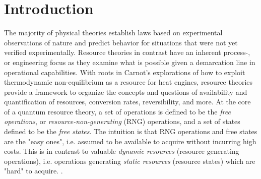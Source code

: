 

\section{Introduction}

The majority of physical theories establish laws based on experimental observations of nature and predict behavior for situations that were not yet verified experimentally. Resource theories in contrast have an inherent process-, or engineering focus as they examine what is possible given a demarcation line in operational capabilities. With roots in Carnot's explorations of how to exploit thermodynamic non-equilibrium as a resource for heat engines, resource theories provide a framework to organize the concepts and questions of availability and quantification of resources, conversion rates, reversibility, and more. At the core of a quantum resource theory, a set of operations is defined to be the \textit{free operations}, or \textit{resource-non-generating} (RNG) operations, and a set of states defined to be the \textit{free states}. The intuition is that RNG operations and free states are the "easy ones", i.e. assumed to be available to acquire without incurring high costs. This is in contrast to valuable \textit{dynamic resources} (resource generating operations), i.e. operations generating \textit{static resources} (resource states) which are "hard" to acquire. \cite{chitambar_quantum_2019}. 

